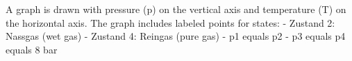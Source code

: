 A graph is drawn with pressure (p) on the vertical axis and temperature (T) on the horizontal axis. The graph includes labeled points for states:  
- Zustand 2: Nassgas (wet gas)  
- Zustand 4: Reingas (pure gas)  
- p1 equals p2  
- p3 equals p4 equals 8 bar